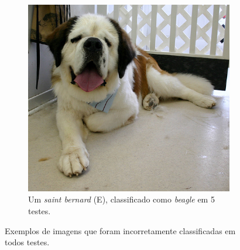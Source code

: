 \begin{figure}
\begin{subfigure}[b]{0.4\textwidth}
    \includegraphics[width=\textwidth]{saint_bernard_bad.jpg}
    \caption{Um \textit{saint bernard} (E), classificado como \textit{beagle} em 5 testes. }
  \end{subfigure}
  \caption{Exemplos de imagens que foram incorretamente classificadas em todos testes.}
  \label{fig:perfectbad}
\end{figure}


